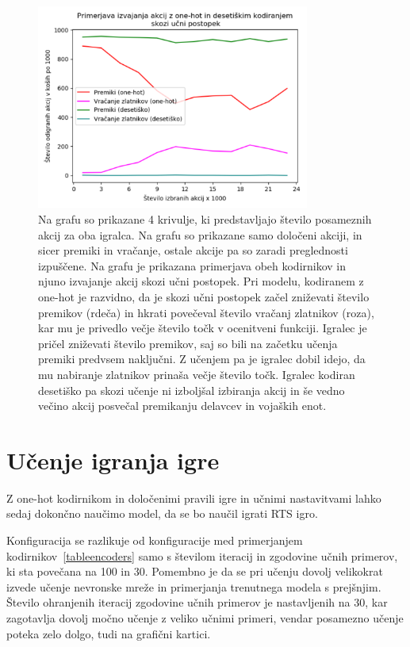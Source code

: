 \documentclass[a4paper, 12pt]{book}
\begin{document}
\begin{figure}[h!]
	\begin{center}
		\includegraphics[width=0.8\textwidth]{photos/onehot_numeric_primerjava_akcij.pdf}
	\end{center}
	\caption{Na grafu so prikazane 4 krivulje, ki predstavljajo število posameznih akcij za oba igralca. Na grafu so prikazane samo določeni akciji, in sicer premiki in vračanje, ostale akcije pa so zaradi preglednosti izpuščene.
		Na grafu je prikazana primerjava obeh kodirnikov in njuno izvajanje akcij skozi učni postopek.
		Pri modelu, kodiranem z one-hot je razvidno, da je skozi učni postopek začel zniževati število premikov (rdeča) in hkrati povečeval število vračanj zlatnikov (roza), kar mu je privedlo večje število točk v ocenitveni funkciji.
		Igralec je pričel zniževati število premikov, saj so bili na začetku učenja premiki predvsem naključni. Z učenjem pa je igralec dobil idejo, da mu nabiranje zlatnikov prinaša večje število točk.
	Igralec kodiran desetiško pa skozi učenje ni izboljšal izbiranja akcij in še vedno večino akcij posvečal premikanju delavcev in vojaških enot. }
	\label{onehotPrimerjavaAkcij}
\end{figure}

\section{Učenje igranja igre}
Z one-hot kodirnikom in določenimi pravili igre in učnimi nastavitvami lahko sedaj dokončno naučimo model, da se bo naučil igrati RTS igro.

Konfiguracija se razlikuje od konfiguracije med primerjanjem kodirnikov~\ref{tableencoders} samo s številom iteracij in zgodovine učnih primerov, ki sta povečana na 100 in 30.
Pomembno je da se pri učenju dovolj velikokrat izvede učenje nevronske mreže in primerjanja trenutnega modela s prejšnjim.
Število ohranjenih iteracij zgodovine učnih primerov je nastavljenih na 30, kar zagotavlja dovolj močno učenje z veliko učnimi primeri, vendar posamezno učenje poteka zelo dolgo, tudi na grafični kartici.
\end{document}
